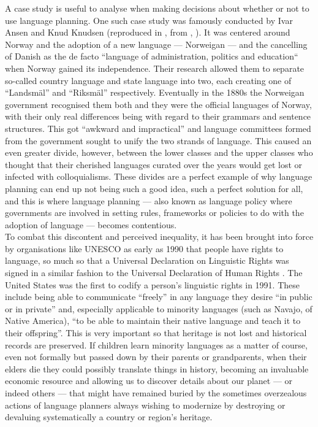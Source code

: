 \documentclass[12pt]{article}
\begin{document}
A case study is useful to analyse when making decisions about whether
or not to use language planning. One such case study was famously
conducted by Ivar Ansen and Knud Knudsen (reproduced in
\citeauthor{sociolinguistics-mesthrie},
\citeyear{sociolinguistics-mesthrie} from
\citeauthor{haugen-planning}, \citeyear{haugen-planning}). It was
centered around Norway and the adoption of a new language ---
Norweigan --- and the cancelling of Danish as the de facto ``language
of administration, politics and education`` when Norway gained its
independence. Their research allowed them to separate so-called
country language and state language into two, each creating one of
``Landsm\"{a}l'' and ``Riksm\"{a}l'' respectively. Eventually in the
1880s the Norweigan government recognised them both and they were the
official languages of Norway, with their only real differences being
with regard to their grammars and sentence structures. This got
``awkward and impractical'' and language committees formed from the
government sought to unify the two strands of language. This caused an
even greater divide, however, between the lower classes and the upper
classes who thought that their cherished languages curated over the
years would get lost or infected with colloquialisms. These divides
are a perfect example of why language planning can end up not being
such a good idea, such a perfect solution for all, and this is where
language planning --- also known as language policy where governments
are involved in setting rules, frameworks or policies to do with the
adoption of language --- becomes contentious.\\

To combat this discontent and perceived inequality, it has been
brought into force by organisations like UNESCO as early as 1990 that
people have rights to language, so much so that a Universal
Declaration on Linguistic Rights was signed in a similar fashion to
the Universal Declaration of Human Rights \citep[p.\
390]{sociolinguistics-mesthrie}. The United States was the first to
codify a person's linguistic rights in 1991. These include being able
to communicate ``freely'' in any language they desire ``in public or
in private'' and, especially applicable to minority languages (such as
Navajo, of Native America), ``to be able to maintain their native
language and teach it to their offspring''. This is very important so
that heritage is not lost and historical records are preserved. If
children learn minority languages as a matter of course, even not
formally but passed down by their parents or grandparents, when their
elders die they could possibly translate things in history, becoming
an invaluable economic resource and allowing us to discover details
about our planet --- or indeed others --- that might have remained
buried by the sometimes overzealous actions of language planners
always wishing to modernize by destroying or devaluing systematically
a country or region's heritage.\\
\end{document}
